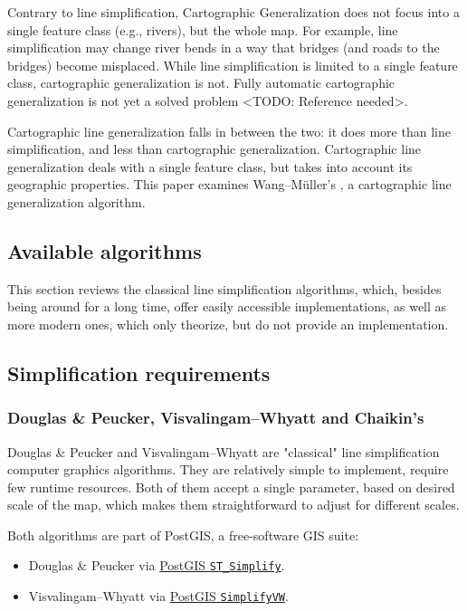 \documentclass[a4paper]{article}
\newcommand{\titlecite}[1]{\citetitle{#1}\cite{#1}}
\newcommand{\DP}{Douglas \& Peucker}
\newcommand{\VW}{Visvalingam--Whyatt}
\newcommand{\WM}{Wang--M{\"u}ller}
\begin{document}
Contrary to line simplification, Cartographic Generalization does not focus
into a single feature class (e.g., rivers), but the whole map. For example,
line simplification may change river bends in a way that bridges (and roads to
the bridges) become misplaced. While line simplification is limited to a single
feature class, cartographic generalization is not. Fully automatic cartographic
generalization is not yet a solved problem <TODO: Reference needed>.

Cartographic line generalization falls in between the two: it does more than
line simplification, and less than cartographic generalization. Cartographic
line generalization deals with a single feature class, but takes into account
its geographic properties. This paper examines {\WM}'s
\titlecite{wang1998line}, a cartographic line generalization algorithm.

\subsection{Available algorithms}

This section reviews the classical line simplification algorithms, which,
besides being around for a long time, offer easily accessible implementations,
as well as more modern ones, which only theorize, but do not provide an
implementation.

\subsection{Simplification requirements}

\subsubsection{{\DP}, {\VW} and Chaikin's}
\label{sec:dp-vw-chaikin}

{\DP}\cite{douglas1973algorithms} and {\VW}\cite{visvalingam1993line} are
"classical" line simplification computer graphics algorithms. They are
relatively simple to implement, require few runtime resources. Both of them
accept a single parameter, based on desired scale of the map, which makes them
straightforward to adjust for different scales.

Both algorithms are part of PostGIS, a free-software GIS suite:
\begin{itemize}
    \item {\DP} via
        \href{https://postgis.net/docs/ST_Simplify.html}{PostGIS \texttt{ST\_Simplify}}.

    \item {\VW} via
        \href{https://postgis.net/docs/ST_SimplifyVW.html}{PostGIS \texttt{SimplifyVW}}.
\end{itemize}
\end{document}
